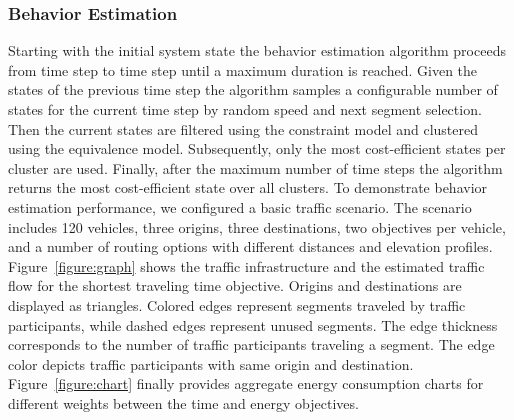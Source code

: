 \documentclass[conference]{../cls/IEEEtran}
\begin{document}
\subsubsection*{Behavior Estimation}
Starting with the initial system state the behavior estimation algorithm
proceeds from time step to time step until a maximum duration is reached. Given
the states of the previous time step the algorithm samples a configurable number
of states for the current time step by random speed and next segment selection.
Then the current states are filtered using the constraint model and clustered
using the equivalence model. Subsequently, only the most cost-efficient states
per cluster are used. Finally, after the maximum number of time steps the
algorithm returns the most cost-efficient state over all clusters. To
demonstrate behavior estimation performance, we configured a basic traffic
scenario. The scenario includes 120 vehicles, three origins, three destinations,
two objectives per vehicle, and a number of routing options with different
distances and elevation profiles. Figure~\ref{figure:graph} shows the traffic
infrastructure and the estimated traffic flow for the shortest traveling time
objective. Origins and destinations are displayed as triangles. Colored edges
represent segments traveled by traffic participants, while dashed edges
represent unused segments. The edge thickness corresponds to the number of
traffic participants traveling a segment. The edge color depicts traffic
participants with same origin and destination. Figure~\ref{figure:chart} finally
provides aggregate energy consumption charts for different weights between the
time and energy objectives.
\end{document}
